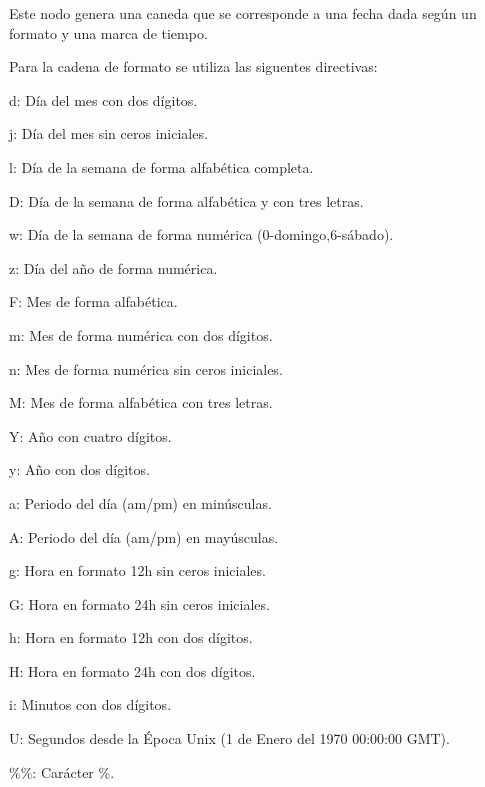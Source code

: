 Este nodo genera una caneda que se corresponde a una fecha dada según un formato y una marca de tiempo.

Para la cadena de formato se utiliza las siguentes directivas\-:
\begin{DoxyItemize}
\item d\-: Día del mes con dos dígitos.
\item j\-: Día del mes sin ceros iniciales.
\item l\-: Día de la semana de forma alfabética completa.
\item D\-: Día de la semana de forma alfabética y con tres letras.
\item w\-: Día de la semana de forma numérica (0-\/domingo,6-\/sábado).
\item z\-: Día del año de forma numérica.
\item F\-: Mes de forma alfabética.
\item m\-: Mes de forma numérica con dos dígitos.
\item n\-: Mes de forma numérica sin ceros iniciales.
\item M\-: Mes de forma alfabética con tres letras.
\item Y\-: Año con cuatro dígitos.
\item y\-: Año con dos dígitos.
\item a\-: Periodo del día (am/pm) en minúsculas.
\item A\-: Periodo del día (am/pm) en mayúsculas.
\item g\-: Hora en formato 12h sin ceros iniciales.
\item G\-: Hora en formato 24h sin ceros iniciales.
\item h\-: Hora en formato 12h con dos dígitos.
\item H\-: Hora en formato 24h con dos dígitos.
\item i\-: Minutos con dos dígitos.
\item U\-: Segundos desde la Época Unix (1 de Enero del 1970 00\-:00\-:00 G\-M\-T).
\item \%\%\-: Carácter \%. 
\end{DoxyItemize}

